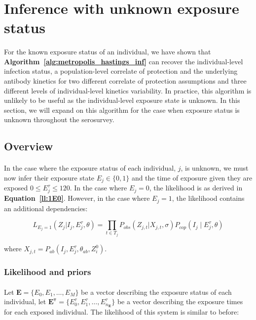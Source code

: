 
\section{Inference with unknown exposure status}

\paragraph{}For the known exposure status of an individual, we have shown that \textbf{Algorithm~\ref{alg:metropolis_hastings_inf}} can recover the individual-level infection status, a population-level correlate of protection and the underlying antibody kinetics for two different correlate of protection assumptions and three different levels of individual-level kinetics variability. In practice, this algorithm is unlikely to be useful as the individual-level exposure state is unknown. In this section, we will expand on this algorithm for the case when exposure status is unknown throughout the serosurvey. 

\subsection{Overview}

\paragraph{}In the case where the exposure status of each individual, $j$, is unknown, we must now infer their exposure state $E_j \in \{0, 1\}$ and the time of exposure given they are exposed $0 \leq E_j^\tau \leq 120$. In the case where $E_j = 0$, the likelihood is as derived in \textbf{Equation~\ref{ll:1E0}}. However, in the case where $E_j = 1$, the likelihood contains an additional dependencies:

\begin{equation}
L_{E_j = 1}(Z_{j}| I_j, E_j^\tau, \theta) = \prod_{t \in T_j}P_{obs}(Z_{j,t}|X_{j,t}, \sigma)P_{cop}(I_j \mid  E^\tau_{j}, \theta)
\end{equation}

where $X_{j,t} =P_{ab}( I_j,  E_j^\tau, \theta_{ab}, Z^0_i) $.

\subsubsection{Likelihood and priors}

\paragraph{}Let $\mathbf{E} = \{E_0, E_1, \dots, E_{M}\}$ be a vector describing the exposure status of each individual, let $\mathbf{E^{\tau}} = \{E^{\tau}_0, E^{\tau}_1, \dots, E^{\tau}_{n_\mathbf{E}}\}$ be a vector describing the exposure times for each exposed individual. The likelihood of this system is similar to before:

